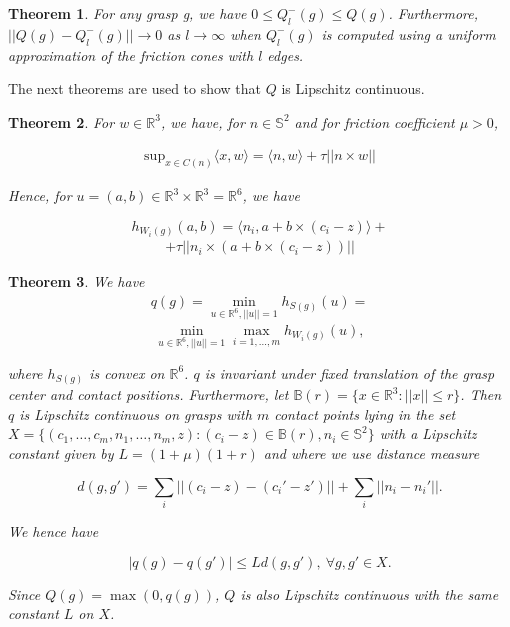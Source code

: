 \documentclass[letterpaper, 10 pt, conference]{ieeeconf}  %
\newtheorem{theorem}{Theorem}
\begin{document}
\begin{theorem}
  \cite{pokorny2013classical}
For any grasp g, we have $0 \leq Q_l^-(g) \leq Q(g)$.
Furthermore, $||Q(g) - Q^-_l(g)|| \rightarrow 0$ as $l \rightarrow \infty$ when $Q_l^-(g)$ is computed using a uniform approximation of the friction cones with $l$ edges. \\
\end{theorem}

The next theorems are used to show that $Q$ is Lipschitz continuous.

\begin{theorem}
\label{lemma35}
  \cite{pokorny2013classical}
For $w \in \mathbb{R}^3$, we have, for $n \in \mathbb{S}^2$ and for friction coefficient $\mu > 0$, 

\begin{align}
\mbox{sup}_{x \in C(n)} \langle x,w \rangle = \langle n,w \rangle + \tau||n \times w||
\end{align}

Hence, for $u = (a,b) \in \mathbb{R}^3 \times \mathbb{R}^3 = \mathbb{R}^6$, we have 

\[
h_{W_i(g)}(a,b) =
 \langle n_i,a+b\times(c_i-z)\rangle +
\]
\begin{align}
 +\tau ||n_i \times (a+b\times(c_i-z))||
\end{align}

\end{theorem}

\begin{theorem}
  \cite{pokorny2013classical}
We have \\

\begin{align}
q(g) 
=
\min_{u\in \mathbb{R}^6, ||u|| =1} h_{S(g)}(u) 
=
\end{align}
\[
\min_{u\in \mathbb{R}^6, ||u|| =1} \max_{i=1,...,m} h_{W_i(g)}(u),
\]

where $h_{S(g)}$ is convex on $\mathbb{R}^6$.
$q$ is invariant under fixed translation of the grasp center and contact positions.
Furthermore, let $\mathbb{B}(r) = \lbrace x \in \mathbb{R}^3 : ||x|| \leq r \rbrace$.
Then $q$ is Lipschitz continuous on grasps with $m$ contact points lying in the set $X = \lbrace (c_1, \dots, c_m,n_1, \dots,n_m,z) : (c_i-z) \in \mathbb{B}(r), n_i \in \mathbb{S}^2 \rbrace$ with a Lipschitz constant given by $L= (1+\mu)(1+r)$ and where we use distance measure 

\[
  d(g,g') = \sum_i ||(c_i-z)-(c_i'-z')|| + \sum_i ||n_i - n_i'||.
\]

We hence have 

\[
|q(g) - q(g')| \leq Ld(g,g'),\  \forall g,g' \in X.
\]

Since $Q(g) = \max(0,q(g))$, $Q$ is also Lipschitz continuous with the same constant $L$ on $X$. 
\end{theorem}
\end{document}
